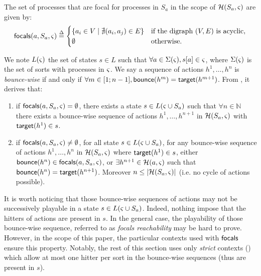 \begin{definition}\label{def:focals}
The set of processes that are focal for processes in $S_a$ in the scope of $\mathcal{H}(S_a,\varsigma)$
are given by:
\[
\mathsf{focals}(a,S_a,\varsigma) \stackrel{\Delta}=
\begin{cases}
\{ a_i \in V \mid \nexists (a_i,a_j)\in E\} & \text{if the digraph $(V,E)$ is acyclic},\\
\emptyset & \text{otherwise.}\\
\end{cases}
\]
\end{definition}

We note $L(\varsigma)$ the set of states $s\in L$ such that $\forall a\in\Sigma(\varsigma), {s[a]}\in\varsigma$,
where $\Sigma(\varsigma)$ is the set of sorts with processes in $\varsigma$.
We say a sequence of actions $h^1,\dots,h^n$ is \emph{bounce-wise} if and only if
$\forall m\in[1;n-1], \mathsf{bounce}(h^m)=\mathsf{target}(h^{m+1})$.
From , it derives that:
\begin{enumerate}
\item if $\mathsf{focals}(a,S_a,\varsigma)=\emptyset$, there exists a 
state $s\in L(\varsigma\cup S_a)$ such that $\forall n\in\mathbb N$ there
exists a bounce-wise sequence of actions $h^1,\dots,h^{n+1}$ in $\mathcal{H}(S_a,\varsigma)$ 
with $\mathsf{target}(h^1)\in s$.
\item if $\mathsf{focals}(a,S_a,\varsigma)\neq\emptyset$, for all
state $s\in L(\varsigma\cup S_a)$,
for any bounce-wise sequence of actions $h^1,\dots,h^n$ in $\mathcal{H}(S_a,\varsigma)$ where $\mathsf{target}(h^1)\in
s$,
either
 $\mathsf{bounce}(h^n) \in \mathsf{focals}(a,S_a,\varsigma)$,
or
$\exists h^{n+1}\in \mathcal{H}(a,\varsigma)$ such that $\mathsf{bounce}(h^n) = \mathsf{target}(h^{n+1})$.
Moreover $n\leq|\mathcal{H}(S_a,\varsigma)|$ (i.e. no cycle of actions possible).
\end{enumerate}

It is worth noticing that those bounce-wise sequences of actions may not be successively playable in
a state $s\in L(\varsigma\cup S_a)$.
Indeed, nothing impose that the hitters of actions are present in $s$.
In the general case, the playability of those bounce-wise sequence, referred to as \emph{focals
reachability} may be hard to prove.
However, in the scope of this paper, the particular contexts used with $\mathsf{focals}$ ensure this property.
Notably, the rest of this section uses only \emph{strict} contexts () which
allow at most one hitter per sort in the bounce-wise sequences (thus are present in $s$).

